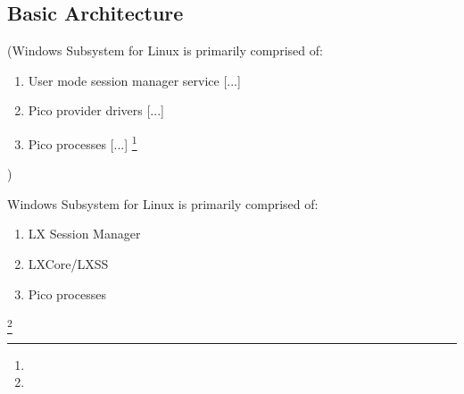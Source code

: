 \documentclass[utf8,biblatex]{lni}
\begin{document}
\subsection{Basic Architecture}

(Windows Subsystem for Linux \glqq is primarily comprised of: 
\begin{enumerate}
    \item User mode session manager service [...]
    \item Pico provider drivers [...]
    \item Pico processes [...] \grqq\footnote{}
\end{enumerate})

Windows Subsystem for Linux is primarily comprised of: 
\begin{enumerate}
    \item LX Session Manager
    \item LXCore/LXSS
    \item Pico processes
\end{enumerate}\footnote{}
\end{document}
